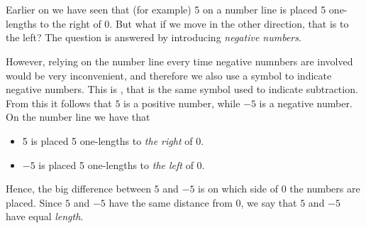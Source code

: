 




\section{\negintro}
Earlier on we have seen that (for example) 5 on a number line is placed 5 one-lengths to the right of 0. 
But what if we move in the other direction, that is to the left? The question is answered by introducing \textit{negative numbers}.\regv

\vsk 
However, relying on the number line every time negative numnbers are involved would be very inconvenient, and therefore we also use a symbol to indicate negative numbers. This is \sym{$ - $}, that is the same symbol used to indicate subtraction. From this it follows that $ 5 $ is a positive number, while $ -5 $ is a negative number. On the number line we have that
\begin{itemize}
	\item 5 is placed 5 one-lengths to \textsl{the right} of 0.
	\item $ -5 $ is placed 5 one-lengths to \textsl{the left} of 0.
\end{itemize}
Hence, the big difference between $ 5 $ and $ -5 $ is on which side of 0 the numbers are placed. Since $ 5 $ and $ -5 $ have the same distance from 0, we say that $ 5 $ and $ -5 $ have equal \textit{length}. \regv

\eks[1]{ \vs \vs
\[ |27|=27 \]
}
\eks[2]{ \vs \vs
\[ |-27|=27 \]
}
\newpage
